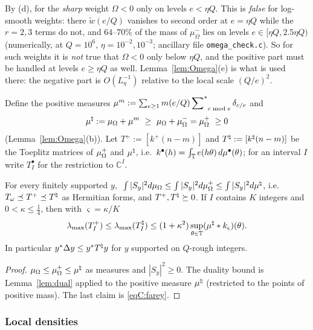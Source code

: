 \begin{remark}\label{rem:negpart}
By (d), for the \emph{sharp} weight $\Omega<0$ only on levels $e<\eta Q$. This is \emph{false} for log-smooth weights: there
$\widetilde w(e/Q)$ vanishes to second order at $e=\eta Q$ while the $r=2,3$ terms do not, and $64$--$70\%$ of the
mass of $\mu_\Omega^-$ lies on levels $e\in[\eta Q,2.5\eta Q)$ (numerically, at $Q=10^6$, $\eta=10^{-2},10^{-3}$; ancillary file \texttt{omega\_check.c}).
So for such weights it is \emph{not} true that $\Omega<0$ only below $\eta Q$, and the positive part must be handled at levels
$e\ge\eta Q$ as well. Lemma~\ref{lem:Omega}(e) is what is used there: the negative part is $O(L_\eta^{-1})$ relative to the local
scale $(Q/e)^2$.
\end{remark}

Define the positive measures $\mu^m:=\sum_{e\ge1}m(e/Q)\sideset{}{^*}\sum_{c\bmod e}\delta_{c/e}$ and
\[
 \mu^\Wnat:=\muO+\mu^m\ \ge\ \muO+\muO^-=\muO^+\ \ge0
\]
(Lemma~\ref{lem:Omega}(b)). Let $T^+:=[k^+(n-m)]$ and $T^\natural:=[k^\natural(n-m)]$ be the Toeplitz matrices of $\mu_\Omega^+$ and
$\mu^\natural$, i.e.\ $k^\bullet(h)=\int_{\mathbb{T}} e(h\theta)\,d\mu^\bullet(\theta)$; for an interval $I$ write $T^\bullet_I$ for the
restriction to $\mathbb C^I$.

\begin{lemma}\label{lem:S}
For every finitely supported $y$,
$\ \int|S_y|^2d\muO\le\int|S_y|^2d\muO^+\le\int|S_y|^2d\mu^\Wnat$, i.e.\ $T_\omega\preceq T^+\preceq T^\natural$ as Hermitian forms,
and $T^+,T^\natural\succeq0$. If $I$ contains $K$ integers and $0<\kappa\le\frac14$, then with $\varsigma=\kappa/K$
\[
 \lambda_{\max}(T^+_I)\le\lambda_{\max}(T^\natural_I)\le(1+\kappa^2)\sup_{\theta\in\mathbb{T}}(\mu^\natural*k_{\varsigma})(\theta).
\]
In particular $y^*\Delta y\le y^*T^\natural y$ for $y$ supported on $Q$-rough integers.
\end{lemma}

\begin{proof}
$\mu_\Omega\le\mu_\Omega^+\le\mu^\natural$ as measures and $|S_y|^2\ge0$. The duality bound is Lemma~\ref{lem:dual} applied to the positive
measure $\mu^\natural$ (restricted to the points of positive mass). The last claim is \eqref{eqC:farey}.
\end{proof}

\subsubsection*{Local densities}

